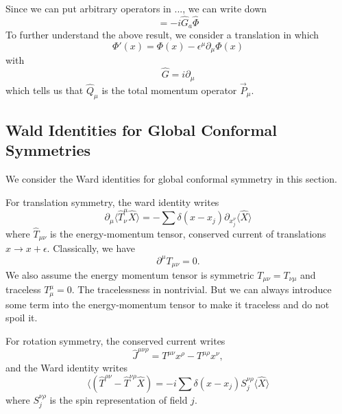 \documentclass[a4paper,11pt]{article}
\begin{document}
Since we can put arbitrary operators in $...$, we can write down
\begin{equation}
    [\hat{Q}_a,\hat{\Phi}]=-i\hat{G}_a\hat{\Phi}
\end{equation}
To further understand the above result, we consider a translation in which
\begin{equation}
    \Phi'(x)=\Phi(x)-\epsilon^\mu\partial_\mu\Phi(x)
\end{equation}
with
\begin{equation}
  \hat{G}=i\partial_\mu  
\end{equation}
which tells us that $\hat{Q}_\mu$ is the total momentum operator $\vec{P}_\mu$.
\subsection{Wald Identities for Global Conformal Symmetries}
We consider the Ward identities for global conformal symmetry in this section.

For translation symmetry, the ward identity writes
\begin{equation}
    \partial_\mu\langle\hat{T}^\mu_\nu\hat{X}\rangle=-\sum\delta(x-x_j)\partial_{x_j^\nu}\langle\hat{X}\rangle
\end{equation}
where $\hat{T}_{\mu\nu}$ is the energy-momentum tensor, conserved current of translations $x\rightarrow x+\epsilon$. Classically, we have
\begin{equation}
    \partial^\mu T_{\mu\nu}=0.
\end{equation}
We also assume the energy momentum tensor is symmetric $T_{\mu\nu}=T_{\nu\mu}$ and traceless $T^\mu_\mu=0$. The tracelessness in nontrivial. But we can always introduce some term into the energy-momentum tensor to make it traceless and do not spoil it.

For rotation symmetry, the conserved current writes
\begin{equation}
    \hat{J}^{\mu\nu\rho}=T^{\mu\nu}x^\rho-T^{\mu\rho}x^\nu,
\end{equation}
and the Ward identity writes
\begin{equation}
    \langle(\hat{T}^{\rho\nu}-\hat{T}^{\nu\rho}\hat{X})=-i\sum\delta(x-x_j)S^{\nu\rho}_j\langle\hat{X}\rangle
\end{equation}
where $S^{\nu\rho}_j$ is the spin representation of field $j$.
\end{document}
